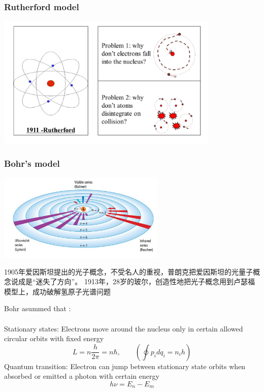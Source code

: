 \begin{frame} 
    \frametitle{Rutherford model}  
    \begin{center}
        \includegraphics[width=0.8\textwidth]{figs/utherford_atom.png}
    \end{center}  
\end{frame}

\begin{frame}   
    \frametitle{Bohr's model}  
    \begin{center}
        \includegraphics[width=0.6\textwidth]{figs/bohratom.png}
    \end{center}  
    1905年爱因斯坦提出的光子概念，不受名人的重视，普朗克把爱因斯坦的光量子概念说成是“迷失了方向”。
    1913年，28岁的玻尔，创造性地把光子概念用到卢瑟福模型上，成功破解氢原子光谱问题 
\end{frame}

\begin{frame}  
    \begin{tcolorbox}[colback=yellow!10,colframe=red!75!black,title=]
    Bohr asummed that :\\
    ~\\
    \bullet Stationary states: Electrons move around the nucleus only in certain allowed circular orbits with fixed energy \\
    \[ L=n \frac{h}{2\pi}= n \hbar,\qquad (\oint p_i dq_i = n_i h)\]
    \bullet Quantum transition: Electron can jump between stationary state orbits when absorbed or emitted a photon with certain energy\\
    \[ h\nu=E_n -E_m \]
    \end{tcolorbox}
\end{frame}

